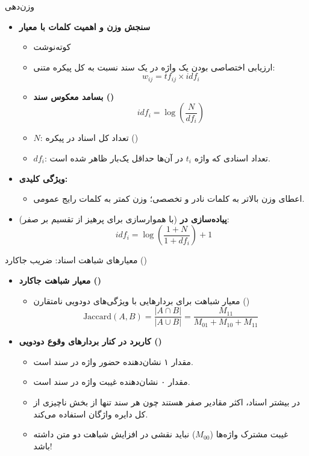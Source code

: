 \begin{frame}{وزن‌دهی }
\begin{itemize}
  \item \textbf{سنجش وزن و اهمیت کلمات با معیار }
  \begin{itemize}
    \item کوته‌نوشت 
    \item ارزیابی اختصاصی بودن یک واژه در یک سند نسبت به کل پیکره متنی:
    $$w_{ij} = tf_{ij} \times idf_i$$
    \item \textbf{بسامد معکوس سند ()}
    $$idf_i = \log\left(\frac{N}{df_i}\right)$$
    \item $N$: تعداد کل اسناد در پیکره ()
    \item $df_i$: تعداد اسنادی که واژه $t_i$ در آن‌ها حداقل یک‌بار ظاهر شده است.
  \end{itemize}
  \vspace{0.15cm}
  \item \textbf{ویژگی کلیدی:}
  \begin{itemize}
    \item اعطای وزن بالاتر به کلمات نادر و تخصصی؛ وزن کمتر به کلمات رایج عمومی.
  \end{itemize}
  \vspace{0.15cm}
  \item \textbf{پیاده‌سازی در } (با هموارسازی برای پرهیز از تقسیم بر صفر):
  $$idf_i = \log\left(\frac{1 + N}{1 + df_i}\right) + 1$$
\end{itemize}
\end{frame}

\begin{frame}{معیارهای شباهت اسناد: ضریب جاکارد ()}
\begin{itemize}
  \item \textbf{معیار شباهت جاکارد ()}
  \begin{itemize}
    \item معیار شباهت برای بردارهایی با ویژگی‌های دودویی نامتقارن ()
    $$\text{Jaccard}(A, B) = \frac{|A \cap B|}{|A \cup B|} = \frac{M_{11}}{M_{01} + M_{10} + M_{11}}$$
  \end{itemize}
  \vspace{0.2cm}
  \item \textbf{کاربرد در کنار بردارهای وقوع دودویی ()}
  \begin{itemize}
    \item مقدار ۱ نشان‌دهنده حضور واژه در سند است.
    \item مقدار ۰ نشان‌دهنده غیبت واژه در سند است.
    \item در بیشتر اسناد، اکثر مقادیر صفر هستند چون هر سند تنها از بخش ناچیزی از کل دایره واژگان استفاده می‌کند.
    \item غیبت مشترک واژه‌ها ($M_{00}$) نباید نقشی در افزایش شباهت دو متن داشته باشد!
  \end{itemize}
\end{itemize}
\end{frame}

